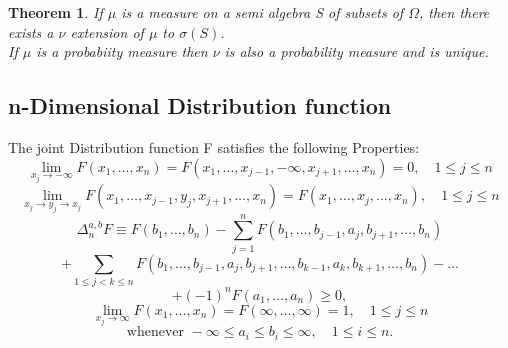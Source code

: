 \documentclass{article}
\newtheorem{theorem}{Theorem}[section]
\begin{document}
\begin{theorem}
    If $\mu$ is a measure on a semi algebra S of subsets of $\Omega$, then there exists a $\nu$ extension of $\mu$ to $\sigma(S)$.\\ If $\mu$ is a probabiity measure then $\nu$ is also a probability measure and is unique.  
\end{theorem}
\subsection{n-Dimensional Distribution function}
The joint Distribution function F satisfies the following Properties:
\\
\[
\lim_{x_j \to -\infty} F(x_1, \dots, x_n) = F(x_1, \dots, x_{j-1}, -\infty, x_{j+1}, \dots, x_n) = 0, \quad 1 \leq j \leq n \tag{1}
\]
\[
\lim_{x_j \to y_j \to x_j} F(x_1, \dots, x_{j-1}, y_j, x_{j+1}, \dots, x_n) = F(x_1, \dots, x_j, \dots, x_n), \quad 1 \leq j \leq n \tag{2}
\]
\[
\Delta_n^{a, b} F \equiv F(b_1, \dots, b_n) 
- \sum_{j=1}^{n} F(b_1, \dots, b_{j-1}, a_j, b_{j+1}, \dots, b_n)
\]
\[
+ \sum_{1 \leq j < k \leq n} F(b_1, \dots, b_{j-1}, a_j, b_{j+1}, \dots, b_{k-1}, a_k, b_{k+1}, \dots, b_n) - \dots
\]
\[
+ (-1)^n F(a_1, \dots, a_n) \geq 0, \tag{3}
\]
\[
\lim_{x_j \to \infty} F(x_1, \dots, x_n) = F(\infty, \dots, \infty) = 1, \quad 1 \leq j \leq n \tag{4}
\]
\[
\text{whenever } -\infty \leq a_i \leq b_i \leq \infty, \quad 1 \leq i \leq n.
\]
\end{document}
